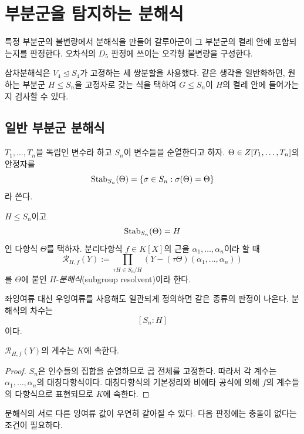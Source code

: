 \clearpage
\section{부분군을 탐지하는 분해식}
\label{sec:subgroup-resolvents}

\begin{learninggoal}
특정 부분군의 불변량에서 분해식을 만들어 갈루아군이 그 부분군의 켤레 안에 포함되는지를 판정한다. 오차식의 $D_5$ 판정에 쓰이는 오각형 불변량을 구성한다.
\end{learninggoal}

삼차분해식은 $V_4\trianglelefteq S_4$가 고정하는 세 쌍분할을 사용했다. 같은 생각을 일반화하면, 원하는 부분군 $H\le S_n$을 고정자로 갖는 식을 택하여 $G\le S_n$이 $H$의 켤레 안에 들어가는지 검사할 수 있다.

\subsection{일반 부분군 분해식}

$T_1,\dots,T_n$을 독립인 변수라 하고 $S_n$이 변수들을 순열한다고 하자. $\Theta\in Z[T_1,\dots,T_n]$의 안정자를
\[
  \operatorname{Stab}_{S_n}(\Theta)
  =\{\sigma\in S_n:\sigma(\Theta)=\Theta\}
\]
라 쓴다.

\begin{definition}
$H\le S_n$이고
\[
  \operatorname{Stab}_{S_n}(\Theta)=H
\]
인 다항식 $\Theta$를 택하자. 분리다항식 $f\in K[X]$의 근을 $\alpha_1,\dots,\alpha_n$이라 할 때
\[
  \mathcal R_{H,f}(Y)
  :=\prod_{\tau H\in S_n/H}
  \left(Y-(\tau\Theta)(\alpha_1,\dots,\alpha_n)\right)
\]
를 $\Theta$에 붙인 $H$-\emph{분해식}(subgroup resolvent)이라 한다.
\end{definition}

좌잉여류 대신 우잉여류를 사용해도 일관되게 정의하면 같은 종류의 판정이 나온다. 분해식의 차수는
\[
  [S_n:H]
\]
이다.

\begin{proposition}
\label{prop:subgroup-resolvent-coefficients}
$\mathcal R_{H,f}(Y)$의 계수는 $K$에 속한다.
\end{proposition}

\begin{proof}
$S_n$은 인수들의 집합을 순열하므로 곱 전체를 고정한다. 따라서 각 계수는 $\alpha_1,\dots,\alpha_n$의 대칭다항식이다. 대칭다항식의 기본정리와 비에타 공식에 의해 $f$의 계수들의 다항식으로 표현되므로 $K$에 속한다.
\end{proof}

분해식의 서로 다른 잉여류 값이 우연히 같아질 수 있다. 다음 판정에는 충돌이 없다는 조건이 필요하다.

